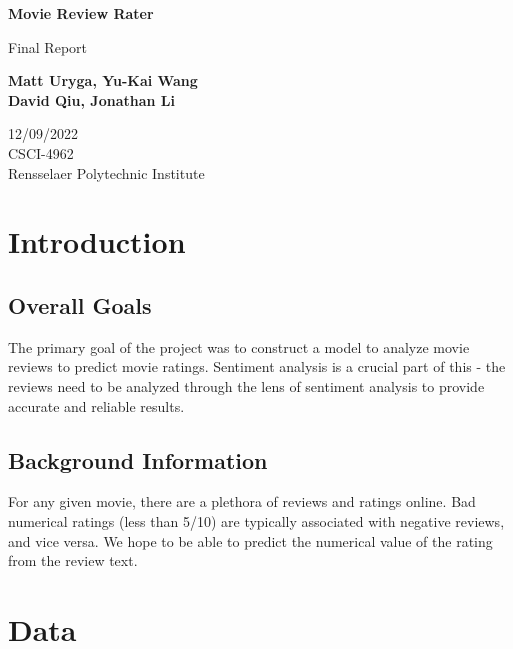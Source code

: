 \documentclass[11pt]{article}
\newcommand{\np}{\newpage}
\begin{document}
\begin{titlepage}
\begin{center}
	\vspace*{1cm}

	\textbf{\Huge Movie Review Rater}

	\vspace{0.5cm}
	{\Large Final Report}

	\vspace{1.5cm}

	\textbf{Matt Uryga, Yu-Kai Wang\\David Qiu, Jonathan Li}

	\vfill

	12/09/2022\\
	CSCI-4962\\
	Rensselaer Polytechnic Institute
\end{center}
\end{titlepage}

\setcounter{secnumdepth}{4}
\setcounter{tocdepth}{4}

\tableofcontents
\np

\section{Introduction}
\subsection{Overall Goals}
The primary goal of the project was to construct a model to analyze movie reviews to predict movie ratings.  Sentiment analysis is a crucial part of this - the reviews need to be analyzed through the lens of sentiment analysis to provide accurate and reliable results.


\subsection{Background Information}
For any given movie, there are a plethora of reviews and ratings online.  Bad numerical ratings (less than 5/10) are typically associated with negative reviews, and vice versa.  We hope to be able to predict the numerical value of the rating from the review text.


\section{Data}
\end{document}
